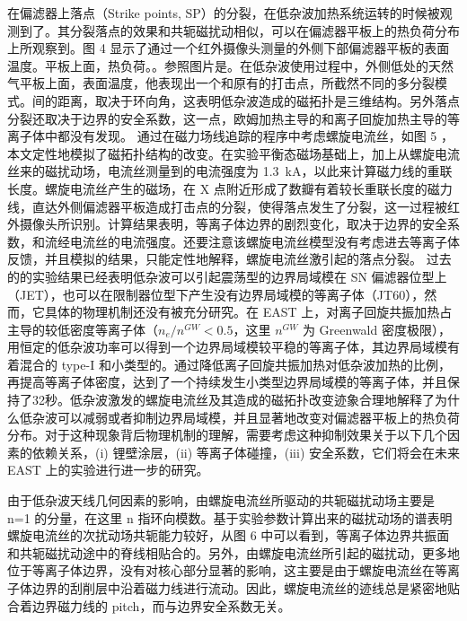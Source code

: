 在偏滤器上落点（Strike points, SP）的分裂，在低杂波加热系统运转的时候被观测到了。其分裂落点的效果和共轭磁扰动相似，可以在偏滤器平板上的热负荷分布上所观察到。图 4 显示了通过一个红外摄像头测量的外侧下部偏滤器平板的表面温度。平板上面，热负荷。。参照图片是。在低杂波使用过程中，外侧低处的天然气平板上面，表面温度，他表现出一个和原有的打击点，所截然不同的多分裂模式。间的距离，取决于环向角，这表明低杂波造成的磁拓扑是三维结构。另外落点分裂还取决于边界的安全系数，这一点，欧姆加热主导的和离子回旋加热主导的等离子体中都没有发现。
通过在磁力场线追踪的程序中考虑螺旋电流丝，如图 5 ，本文定性地模拟了磁拓扑结构的改变。在实验平衡态磁场基础上，加上从螺旋电流丝来的磁扰动场，电流丝测量到的电流强度为 \SI{1.3}{\kilo\ampere}，以此来计算磁力线的重联长度。螺旋电流丝产生的磁场，在 X 点附近形成了数瓣有着较长重联长度的磁力线，直达外侧偏滤器平板造成打击点的分裂，使得落点发生了分裂，这一过程被红外摄像头所识别。计算结果表明，等离子体边界的剧烈变化，取决于边界的安全系数，和流经电流丝的电流强度。还要注意该螺旋电流丝模型没有考虑进去等离子体反馈，并且模拟的结果，只能定性地解释，螺旋电流丝激引起的落点分裂。
过去的的实验结果已经表明低杂波可以引起震荡型的边界局域模\Hmode 在 SN 偏滤器位型上（JET），也可以在限制器位型下产生没有边界局域模的\Hmode 等离子体（JT60），然而，它具体的物理机制还没有被充分研究。在 EAST 上，对离子回旋共振加热占主导的较低密度等离子体（$n_e/n^{GW}<0.5$，这里 $n^{GW}$ 为 Greenwald 密度极限），用恒定的低杂波功率可以得到一个边界局域模较平稳的\Hmode 等离子体，其边界局域模有着混合的 type-I 和小类型的。通过降低离子回旋共振加热对低杂波加热的比例，再提高等离子体密度，达到了一个持续发生小类型边界局域模的\Hmode 等离子体，并且保持了32秒。低杂波激发的螺旋电流丝及其造成的磁拓扑改变迹象合理地解释了为什么低杂波可以减弱或者抑制边界局域模，并且显著地改变对偏滤器平板上的热负荷分布。对于这种现象背后物理机制的理解，需要考虑这种抑制效果关于以下几个因素的依赖关系，(i) 锂壁涂层，(ii) 等离子体碰撞，(iii) 安全系数，它们将会在未来 EAST 上的实验进行进一步的研究。

由于低杂波天线几何因素的影响，由螺旋电流丝所驱动的共轭磁扰动场主要是 n=1 的分量，在这里 n 指环向模数。基于实验参数计算出来的磁扰动场的谱表明螺旋电流丝的次扰动场共轭能力较好，从图 6 中可以看到，等离子体边界共振面和共轭磁扰动途中的脊线相贴合的。另外，由螺旋电流丝所引起的磁扰动，更多地位于等离子体边界，没有对核心部分显著的影响，这主要是由于螺旋电流丝在等离子体边界的刮削层中沿着磁力线进行流动。因此，螺旋电流丝的迹线总是紧密地贴合着边界磁力线的 pitch，而与边界安全系数无关。

